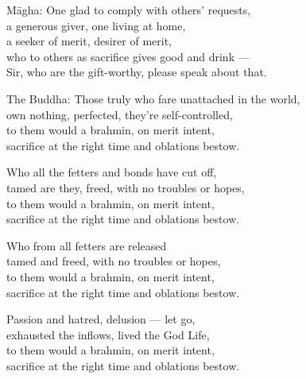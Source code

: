 \begin{MyDescription}{M\=agha:}
One glad to comply with others' requests,\\
a generous giver, one living at home,\\
a seeker of merit, desirer of merit,\\
who to others as sacrifice gives good and drink —\\
Sir, who are the gift-worthy, please speak about that.
\end{MyDescription}

\begin{MyDescription}{The Buddha:}
Those truly who fare unattached in the world,\\
own nothing, perfected, they're self-controlled,\\
to them would a brahmin, on merit intent,\\
sacrifice at the right time and oblations bestow.
\end{MyDescription}

\begin{MyDescription}{}
Who all the fetters and bonds have cut off,\\
tamed are they, freed, with no troubles or hopes,\\
to them would a brahmin, on merit intent,\\
sacrifice at the right time and oblations bestow.
\end{MyDescription}

\begin{MyDescription}{}
Who from all fetters are released\\
tamed and freed, with no troubles or hopes,\\
to them would a brahmin, on merit intent,\\
sacrifice at the right time and oblations bestow.
\end{MyDescription}

\begin{MyDescription}{}
Passion and hatred, delusion — let go,\\
exhausted the inflows, lived the God Life,\\
to them would a brahmin, on merit intent,\\
sacrifice at the right time and oblations bestow.
\end{MyDescription}

